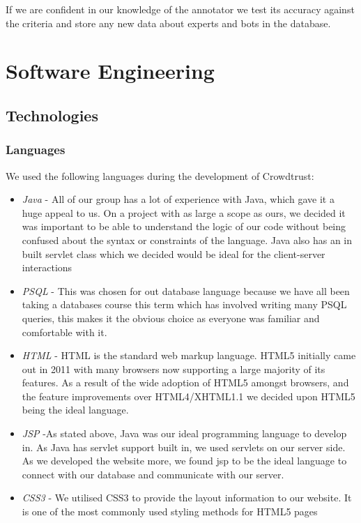 \documentclass[11pt]{article}
\begin{document}
If we are confident in our knowledge of the annotator we test its accuracy against the criteria and store any new data about experts and bots in the database.\\

 
 
\section{Software Engineering}
\subsection{Technologies}
\subsubsection{Languages}
We used the following languages during the development of Crowdtrust:
\begin{itemize}
\item
\emph{Java} - All of our group has a lot of experience with Java, which gave it a huge appeal to us.
On a project with as large a scope as ours, we decided it was important to be able
to understand the logic of our code without being confused about the syntax or
constraints of the language. Java also has an in built servlet class which we
decided would be ideal for the client-server interactions 
\item
\emph{PSQL} - This was chosen for out database language because we have all been
taking a databases course this term which has involved writing many PSQL queries,
this makes it the obvious choice as everyone was familiar and comfortable with it.
\item
\emph{HTML} -
HTML is the standard web markup language. HTML5 initially came out in 2011 with many
browsers now supporting a large majority of its features. As a result of the wide
adoption of HTML5 amongst browsers, and the feature improvements over HTML4/XHTML1.1
we decided upon HTML5 being the ideal language.
\item
\emph{JSP} -As stated above, Java was our ideal programming language to develop in. As Java
has servlet support built in, we used servlets on our server side. As we developed
the website more, we found jsp to be the ideal language to connect with our database
and communicate with our server.
\item
\emph{CSS3} - We utilised CSS3 to provide the layout information to our website. It is one of the
most commonly used styling methods for HTML5 pages
\end{itemize}
\end{document}
